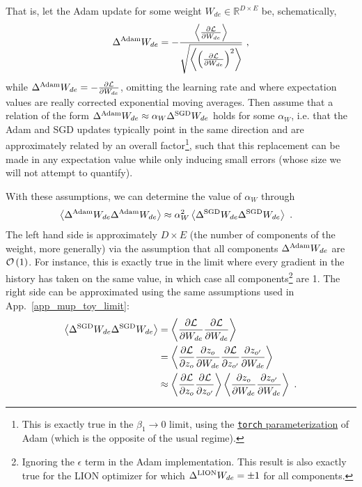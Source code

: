 \documentclass[11pt]{article}
\begin{document}
That is, let the Adam update for some weight $ W_{ de }\in \mathbb{R}^{ D\times E } $ be, schematically,
 \begin{align}
 \Delta^{ {\rm Adam} }    W_{ de }  =- \frac{ \left\langle \frac{ \partial \mathcal{L} }{ \partial W_{ de } } \right\rangle }{ \sqrt{ \left\langle \left (\frac{ \partial \mathcal{L} }{ \partial W_{ de } }\right )^{ 2 } \right\rangle } } \ ,
 \end{align}
 while  $ \Delta^{ {\rm Adam} }    W_{ de } =- \frac{ \partial \mathcal{L} }{ \partial W_{ de } } $,
 omitting the learning rate and where expectation values are really corrected exponential moving
 averages.  Then assume that a relation of the form $ \Delta^{ {\rm Adam} }    W_{ de }\approx
 \alpha_{ W } \Delta^{ {\rm SGD} }    W_{ de } $ holds for some $ \alpha_{ W } $, i.e. that the Adam
 and SGD updates typically point in the same direction and are approximately related by an overall
 factor\footnote{This is exactly true in the $ \beta_{ 1  }\longrightarrow 0 $ limit, using the
 \href{https://pytorch.org/docs/stable/generated/torch.optim.Adam.html}{\texttt{torch}
parameterization} of Adam (which is the opposite of the usual regime).}, such that this replacement can be made in any expectation value while
only inducing small errors (whose size we will not attempt to quantify).

With these assumptions, we can determine the value of $ \alpha_{ W } $ through
 \begin{align}
     \left\langle \Delta^{ {\rm Adam} }    W_{ de }\Delta^{ {\rm Adam} }    W_{ de } \right\rangle
     &\approx \alpha_{ W }^{ 2 } \left\langle \Delta^{ {\rm SGD} }    W_{ de }\Delta^{ {\rm SGD} }    W_{ de } \right\rangle \ .
 \end{align}
The left hand side is approximately $ D\times E $ (the number of components of the weight, more
generally) via the assumption that all components $ \Delta^{ {\rm Adam} }    W_{ de } $ are $ \mathcal{O}
\left( 1 \right)  $. For instance, this is exactly true in the limit where every gradient in the
history has taken on the same value, in which case all components\footnote{Ignoring the $ \epsilon $
term in the Adam implementation. This result is also exactly true for the LION optimizer
\cite{chen2023symbolicdiscoveryoptimizationalgorithms} for which $ \Delta^{ {\rm LION} }    W_{ de }
=\pm 1 $ for all components.} are 1. The right side can be approximated using the same assumptions
used in App.~\ref{app_mup_toy_limit}:
\begin{align}
    \left\langle \Delta^{ {\rm SGD} }    W_{ de }\Delta^{ {\rm SGD} }    W_{ de } \right\rangle      &= \left\langle \frac{ \partial \mathcal{L} }{ \partial W_{ de } }\frac{ \partial \mathcal{L} }{ \partial W_{ de } } \right\rangle\nonumber\\
         &=\left\langle \frac{ \partial \mathcal{L} }{ \partial z_{ o } }\frac{ \partial z_{ o } }{ \partial W_{ de } }\frac{\partial \mathcal{L} }{ \partial z_{ o' } }\frac{ \partial z_{ o' } }{ \partial W_{ de } } \right\rangle\nonumber\\
         &\approx \left\langle \frac{ \partial \mathcal{L} }{ \partial z_{ o } }\frac{\partial \mathcal{L} }{ \partial z_{ o' } }\right\rangle \left \langle  \frac{ \partial z_{ o } }{ \partial W_{ de } }\frac{ \partial z_{ o' } }{ \partial W_{ de } } \right\rangle \ .
\end{align}
\end{document}
